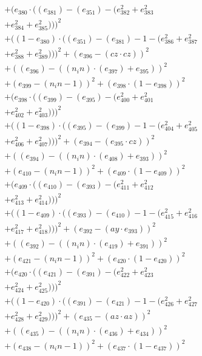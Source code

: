 \documentclass[10pt, a4paper]{article}
\begin{document}
\begin{align*}
& + (e_{380}  \cdot  ((e_{381}) - (e_{351}) - (e_{382}^{2} + e_{383}^{2} \\
& + e_{384}^{2} + e_{385}^{2})))^{2} \\
& + ((1 - e_{380})  \cdot  ((e_{351}) - (e_{381}) - 1 - (e_{386}^{2} + e_{387}^{2} \\
& + e_{388}^{2} + e_{389}^{2})))^{2} + (e_{396} - (cz  \cdot  cz))^{2} \\
& + ((e_{396}) - ((n_in)  \cdot  (e_{397}) + e_{395}))^{2} \\
& + (e_{399} - (n_in - 1))^{2} + (e_{398}  \cdot  (1 - e_{398}))^{2} \\
& + (e_{398}  \cdot  ((e_{399}) - (e_{395}) - (e_{400}^{2} + e_{401}^{2} \\
& + e_{402}^{2} + e_{403}^{2})))^{2} \\
& + ((1 - e_{398})  \cdot  ((e_{395}) - (e_{399}) - 1 - (e_{404}^{2} + e_{405}^{2} \\
& + e_{406}^{2} + e_{407}^{2})))^{2} + (e_{394} - (e_{395}  \cdot  cz))^{2} \\
& + ((e_{394}) - ((n_in)  \cdot  (e_{408}) + e_{393}))^{2} \\
& + (e_{410} - (n_in - 1))^{2} + (e_{409}  \cdot  (1 - e_{409}))^{2} \\
& + (e_{409}  \cdot  ((e_{410}) - (e_{393}) - (e_{411}^{2} + e_{412}^{2} \\
& + e_{413}^{2} + e_{414}^{2})))^{2} \\
& + ((1 - e_{409})  \cdot  ((e_{393}) - (e_{410}) - 1 - (e_{415}^{2} + e_{416}^{2} \\
& + e_{417}^{2} + e_{418}^{2})))^{2} + (e_{392} - (ay  \cdot  e_{393}))^{2} \\
& + ((e_{392}) - ((n_in)  \cdot  (e_{419}) + e_{391}))^{2} \\
& + (e_{421} - (n_in - 1))^{2} + (e_{420}  \cdot  (1 - e_{420}))^{2} \\
& + (e_{420}  \cdot  ((e_{421}) - (e_{391}) - (e_{422}^{2} + e_{423}^{2} \\
& + e_{424}^{2} + e_{425}^{2})))^{2} \\
& + ((1 - e_{420})  \cdot  ((e_{391}) - (e_{421}) - 1 - (e_{426}^{2} + e_{427}^{2} \\
& + e_{428}^{2} + e_{429}^{2})))^{2} + (e_{435} - (az  \cdot  az))^{2} \\
& + ((e_{435}) - ((n_in)  \cdot  (e_{436}) + e_{434}))^{2} \\
& + (e_{438} - (n_in - 1))^{2} + (e_{437}  \cdot  (1 - e_{437}))^{2} \\

\end{align*}
\end{document}
